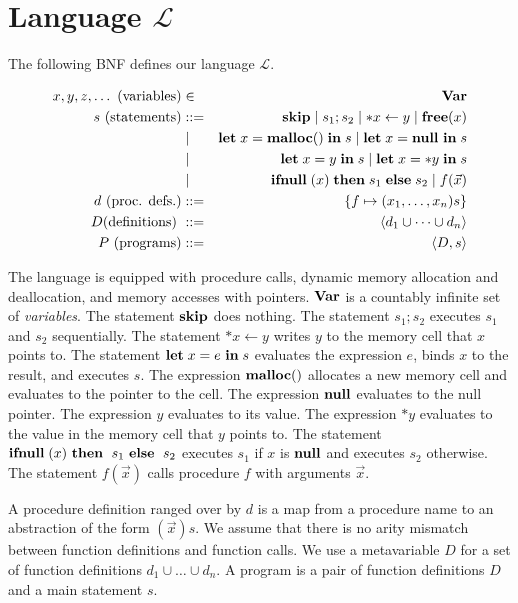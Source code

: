 
\section{Language \(\mathcal{L}\)}\label{sec:language}

The following BNF defines our language \(\mathcal{L}\).

\begin{eqnarray*}
  x,y,z,\dots \mbox{ (variables)} &\in& \mathbf{Var}\\
  s \mbox{ (statements)} & ::= &  \mathbf{skip} \mid s_{1};s_{2} \mid *x \leftarrow y \mid \mathbf{free}(x) \\
  & \mid & \mathbf{let}\; x = \mathbf{malloc()}\; \mathbf{in}\; s \mid \mathbf{let}\; x = \mathbf{null}\ \mathbf{in}\; s  \\
  & \mid & \mathbf{let}\; x = y \; \mathbf{in}\; s \mid   \mathbf{let}\; x = *y \; \mathbf{in}\; s \\
  & \mid & \mathbf{ifnull}\;(x) \; \mathbf{then}\; s_{1}\; \mathbf{else}\; s_{2} \mid f(\vec{x})\\
  d \mbox{ (proc. defs.)} & ::= & \{f \mapsto (x_1,\dots,x_n)s\}\\
  D \mbox{(definitions) } &::=& \langle d_1 \cup \dots \cup d_n \rangle\\
  P \mbox{ (programs)} &::=& \langle D, s \rangle\\
\end{eqnarray*}

The language is equipped with procedure calls, dynamic memory
allocation and deallocation, and memory accesses with pointers.
\(\mathbf{Var}\) is a countably infinite set of \emph{variables}.  The
statement \(\mathbf{skip}\) does nothing.  The statement \(s_1;s_2\) executes
\(s_1\) and \(s_2\) sequentially.  The statement \(*x \leftarrow y\)
writes \(y\) to the memory cell that \(x\) points to.  The statement
\(\mathbf{let}\; x = e\ \mathbf{in}\; s\) evaluates the expression \(e\), binds \(x\) to
the result, and executes \(s\).  The expression \(\mathbf{malloc}()\)
allocates a new memory cell and evaluates to the pointer to the cell.
The expression \(\mathbf{null}\) evaluates to the null pointer.  The
expression \(y\) evaluates to its value.  The expression \(*y\)
evaluates to the value in the memory cell that \(y\) points to.  The
statement \(\IFNULL(x)\ \THEN\ s_1\ \ELSE\ s_2\) executes \(s_1\) if
\(x\) is \(\mathbf{null}\) and executes \(s_2\) otherwise.  The statement
\(f(\vec{x})\) calls procedure \(f\) with arguments \(\vec{x}\).

A procedure definition ranged over by \(d\) is a map from a procedure
name to an abstraction of the form \((\vec{x})s\).  We assume that
there is no arity mismatch between function definitions and function
calls.  We use a metavariable \(D\) for a set of function definitions
\(d_1 \cup \dots \cup d_n\).  A program is a pair of function
definitions \(D\) and a main statement \(s\).


